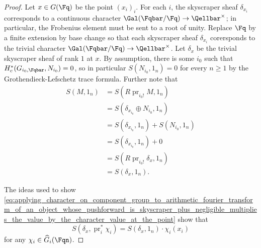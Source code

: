 \begin{proof}
    Let $x \in G(\Fq)$ be the point $(x_i)_i$. For each $i$, the skyscraper sheaf $\delta_{x_i}$ corresponds to a continuous character $\Gal(\Fqbar/\Fq) \to \Qellbar^\times$; in particular, the Frobenius element must be sent to a root of unity. Replace $\Fq$ by a finite extension by base change so that each skyscraper sheaf $\delta_{x_i}$ corersponds to the trivial character $\Gal(\Fqbar/\Fq) \to \Qellbar^\times$. Let $\delta_x$ be the trivial skyscraper sheaf of rank $1$ at $x$. By assumption, there is some $i_0$ such that $H_c^*(G_{i_0, \Fqbar}, N_{i_0}) = 0$, so in particular $S(N_{i_0}, 1_{n}) = 0$ for every $n \geq 1$ by the Grothendieck-Lefschetz trace formula. Further note that 
    \begin{align} \label{eq:object_whose_pushforwards_are_skyscraper_mod_negligibles_and_well_chosen_skyscraper_have_equal_arithmetic_fourier_transform}
    S(M, 1_n) &= S(R\operatorname{pr}_{i_0 !} M, 1_n) \\ \nonumber
    &= S(\delta_{x_{i_0}} \oplus N_{i_0} , 1_n) \\ \nonumber
    &= S(\delta_{x_{i_0}}, 1_n) + S(N_{i_0}, 1_n) \\ \nonumber
    &= S(\delta_{x_{i_0}}, 1_n) + 0 \\ \nonumber
    &= S(R\operatorname{pr}_{i_0 !} \delta_x, 1_n) \\ \nonumber
    &= S(\delta_x, 1_n). \nonumber
    \end{align}
    
    The ideas used to show \eqref{eq:applying_character_on_component_group_to_arithmetic_fourier_transform_of_an_object_whose_pushforward_is_skyscraper_plus_negligible_multiplies_the_value_by_the_character_value_at_the_point} show that 
    \begin{equation} \label{eq:applying_character_on_component_group_to_arithmetic_fourier_transform_of_a_skyscraper_multiplies_the_value_by_the_character_value_at_the_point}
    S(\delta_x, \operatorname{pr}_i^* \chi_i) = S(\delta_x, 1_n) \cdot \chi_i(x_i)
    \end{equation}
    for any $\chi_i \in \widehat{G}_i(\Fqn)$. 


\end{proof}

